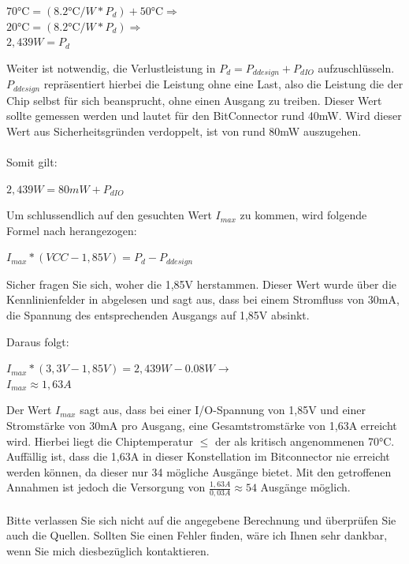 \documentclass{article}
\begin{document}
{\begin{center}
	$70 \si{\celsius} = (8.2 \si{\celsius}/W*P_d)+50 \si{\celsius} \Rightarrow$\\
	$20 \si{\celsius} = (8.2 \si{\celsius}/W*P_d)\Rightarrow$\\
	$2,439 W = P_d$\\ %
\end{center}

Weiter ist notwendig, die Verlustleistung in $P_d = P_{ddesign} + P_{dIO}$ aufzuschlüsseln.
$P_{ddesign}$ repräsentiert hierbei die Leistung ohne eine Last, also die Leistung die der Chip selbst für sich beansprucht, ohne einen Ausgang zu treiben. Dieser Wert sollte gemessen werden und lautet für den BitConnector rund 40mW. Wird dieser Wert aus Sicherheitsgründen verdoppelt, ist von rund 80mW auszugehen.\\\\
Somit gilt: 
\begin{center}
	$2,439 W = 80mW + P_{dIO}$
\end{center}

Um schlussendlich auf den gesuchten Wert $I_{max}$ zu kommen, wird folgende Formel nach \autocite[16]{XC95_maxI} herangezogen:

\begin{center}
	$I_{max} * (VCC - 1,85V) = P_d - P_{ddesign}$
\end{center}

Sicher fragen Sie sich, woher die 1,85V herstammen. Dieser Wert wurde über die Kennlinienfelder in \autocite[6]{XC_Curves} abgelesen und sagt aus, dass bei einem Stromfluss von 30mA, die Spannung des entsprechenden Ausgangs auf 1,85V absinkt.

Daraus folgt: 
\begin{center}
	$I_{max} * (3,3V - 1,85V) = 2,439 W - 0.08W \rightarrow$\\
	\underline{\underline{$I_{max}\approx 1,63A $}}
\end{center}
Der Wert $I_{max}$ sagt aus, dass bei einer I/O-Spannung von 1,85V und einer Stromstärke von 30mA pro Ausgang, eine Gesamtstromstärke von 1,63A erreicht wird. Hierbei liegt die Chiptemperatur $\leq $ der als kritisch angenommenen 70$\si{\celsius}$. Auffällig ist, dass die 1,63A in dieser Konstellation im Bitconnector nie erreicht werden können, da dieser nur 34 mögliche Ausgänge bietet. Mit den getroffenen Annahmen ist jedoch die Versorgung von $\frac{1,63A}{0,03A}\approx54$ Ausgänge möglich.\\\\
Bitte verlassen Sie sich nicht auf die angegebene Berechnung und überprüfen Sie auch die Quellen. Sollten Sie einen Fehler finden, wäre ich Ihnen sehr dankbar, wenn Sie mich diesbezüglich kontaktieren.

}
\end{document}
